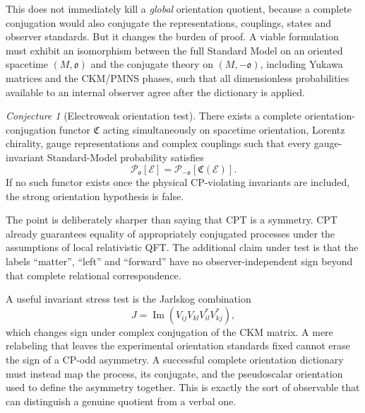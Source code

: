 \documentclass[11pt]{article}
\theoremstyle{definition}\newtheorem{definition}[theorem]{Definition}
\theoremstyle{remark}\newtheorem{remark}[theorem]{Remark}\newtheorem{conjecture}[theorem]{Conjecture}
\begin{document}
This does not immediately kill a \emph{global} orientation quotient, because a complete conjugation would also conjugate the representations, couplings, states and observer standards. But it changes the burden of proof. A viable formulation must exhibit an isomorphism between the full Standard Model on an oriented spacetime $(M,\mathfrak o)$ and the conjugate theory on $(M,-\mathfrak o)$, including Yukawa matrices and the CKM/PMNS phases, such that all dimensionless probabilities available to an internal observer agree after the dictionary is applied.

\begin{conjecture}[Electroweak orientation test]\label{conj:EW}
There exists a complete orientation-conjugation functor $\mathfrak C$ acting simultaneously on spacetime orientation, Lorentz chirality, gauge representations and complex couplings such that every gauge-invariant Standard-Model probability satisfies
\begin{equation}
 \mathcal P_{\mathfrak o}[\mathcal E]
 =\mathcal P_{-\mathfrak o}[\mathfrak C(\mathcal E)].
\end{equation}
If no such functor exists once the physical CP-violating invariants are included, the strong orientation hypothesis is false.
\end{conjecture}

The point is deliberately sharper than saying that CPT is a symmetry. CPT already guarantees equality of appropriately conjugated processes under the assumptions of local relativistic QFT. The additional claim under test is that the labels ``matter'', ``left'' and ``forward'' have no observer-independent sign beyond that complete relational correspondence.

A useful invariant stress test is the Jarlskog combination
\begin{equation}
 J=\operatorname{Im}(V_{ij}V_{kl}V^*_{il}V^*_{kj}),
\end{equation}
which changes sign under complex conjugation of the CKM matrix. A mere relabeling that leaves the experimental orientation standards fixed cannot erase the sign of a CP-odd asymmetry. A successful complete orientation dictionary must instead map the process, its conjugate, and the pseudoscalar orientation used to define the asymmetry together. This is exactly the sort of observable that can distinguish a genuine quotient from a verbal one.
\end{document}
